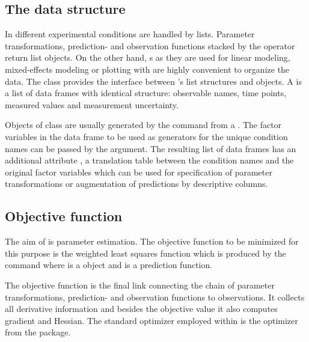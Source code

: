 \documentclass[article]{jss}
\begin{document}
\subsection{The data structure}

In  different experimental conditions are handled by lists. Parameter transformations, prediction- and observation functions stacked by the  operator return list objects. On the other hand, s as they are used for linear modeling, mixed-effects modeling or plotting with  are highly convenient to organize the data.
The class  provides the interface between 's list structures and  objects.
A  is a list of data frames with identical structure: observable names, time points, measured values and measurement uncertainty.

Objects of class  are usually generated by the  command from a . The factor variables in the data frame to be used as generators for the unique condition names can be passed by the  argument. The resulting list of data frames has an additional attribute , a translation table between the condition names and the original factor variables which can be used for specification of parameter transformations or augmentation of predictions by descriptive columns.


\subsection{Objective function}


The aim of  is parameter estimation. The objective function to be minimized for this purpose is the weighted least squares function which is produced by the command  where  is a  object and  is a prediction function.

The objective function is the final link connecting the chain of parameter transformations, prediction- and observation functions to observations. It collects all derivative information and besides the objective value it also computes gradient and Hessian. The standard optimizer employed within  is the  optimizer from the  package.
\end{document}
